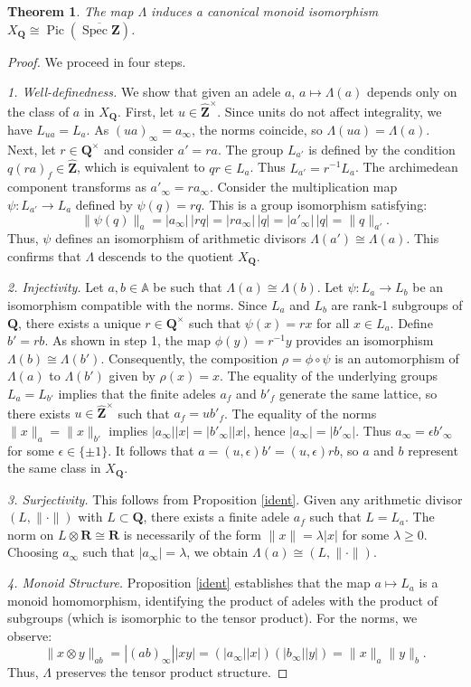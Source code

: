 \documentclass[11pt,a4paper]{article}
\newcommand{\Q}{\mathbf{Q}}
\newcommand{\Z}{\mathbf{Z}}
\newcommand{\R}{\mathbf{R}}
\newcommand{\A}{\mathbb{A}}
\newcommand{\Zhat}{\widehat{\Z}}
\def\spzb{\overline{\Spec \Z}}
\newcommand{\Spec}{\operatorname{Spec}}
\def\Pic{\operatorname{Pic}}
\theoremstyle{plain}
\newtheorem{thm}{Theorem}[section]
\theoremstyle{definition} %
\begin{document}
\begin{thm} \label{xqthm1} 
The map $\Lambda$ induces a canonical monoid isomorphism $X_\Q \cong \Pic(\spzb)$.
\end{thm} 

\begin{proof} 
We proceed in four steps.

\emph{1. Well-definedness.} 
We show that given an adele $a$,  $a\mapsto \Lambda(a)$ depends only on the class of $a$ in $X_\Q$.
First, let $u \in \Zhat^\times$. Since units do not affect integrality, we have $L_{ua} = L_a$. As $(ua)_\infty = a_\infty$, the norms coincide, so $\Lambda(ua) = \Lambda(a)$.
Next, let $r \in \Q^\times$ and consider $a' = ra$. The group $L_{a'}$ is defined by the condition $q(ra)_f \in \Zhat$, which is equivalent to $qr \in L_a$. Thus $L_{a'} = r^{-1} L_a$.
The archimedean component transforms as $a'_\infty = r a_\infty$. Consider the multiplication map $\psi: L_{a'} \to L_a$ defined by $\psi(q) = rq$. This is a group isomorphism satisfying:
\[
\|\psi(q)\|_a = |a_\infty| \, |rq| = |r a_\infty| \, |q| = |a'_\infty| \, |q| = \|q\|_{a'}.
\]
Thus, $\psi$ defines an isomorphism of arithmetic divisors $\Lambda(a') \cong \Lambda(a)$. This confirms that $\Lambda$ descends to the quotient $X_\Q$.

\emph{2. Injectivity.} 
Let $a, b \in \A$ be such that $\Lambda(a)\cong \Lambda(b)$. Let $\psi: L_a \to L_b$ be an isomorphism compatible with the norms. Since $L_a$ and $L_b$ are rank-1 subgroups of $\Q$, there exists a unique $r \in \Q^\times$ such that $\psi(x) = rx$ for all $x \in L_a$.
Define $b' = rb$. As shown in step 1, the map $\phi(y) = r^{-1}y$ provides an isomorphism $\Lambda(b) \cong \Lambda(b')$. Consequently, the composition $\rho = \phi \circ \psi$ is an automorphism of $\Lambda(a)$ to $\Lambda(b')$ given by $\rho(x) = x$.
The equality of the underlying groups $L_a = L_{b'}$ implies that the finite adeles $a_f$ and $b'_f$ generate the same lattice, so there exists $u \in \Zhat^\times$ such that $a_f = u b'_f$.
The equality of the norms $\|x\|_a = \|x\|_{b'}$ implies $|a_\infty| |x| = |b'_\infty| |x|$, hence $|a_\infty| = |b'_\infty|$. Thus $a_\infty = \epsilon b'_\infty$ for some $\epsilon \in \{\pm 1\}$.
It follows that $a = (u, \epsilon) b' = (u, \epsilon) r b$, so $a$ and $b$ represent the same class in $X_\Q$.

\emph{3. Surjectivity.} 
This follows from Proposition \ref{ident}. Given any arithmetic divisor $(L, \|\cdot\|)$ with $L \subset \Q$, there exists a finite adele $a_f$ such that $L = L_a$. The norm on $L \otimes \R \cong \R$ is necessarily of the form $\|x\| = \lambda |x|$ for some $\lambda \ge 0$. Choosing $a_\infty$ such that $|a_\infty| = \lambda$, we obtain $\Lambda(a) \cong (L, \|\cdot\|)$.

\emph{4. Monoid Structure.} 
Proposition \ref{ident} establishes that the map $a \mapsto L_a$ is a monoid homomorphism, identifying the product of adeles with the product of subgroups (which is isomorphic to the tensor product). For the norms, we observe:
\[
\|x \otimes y\|_{ab} = |(ab)_\infty| |xy| = (|a_\infty| |x|) (|b_\infty| |y|) = \|x\|_a \|y\|_b.
\]
Thus, $\Lambda$ preserves the tensor product structure.
\end{proof}
\end{document}
